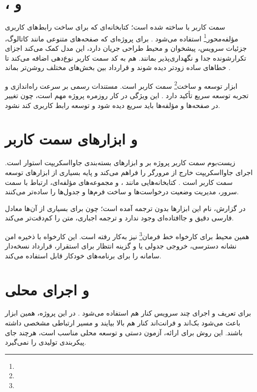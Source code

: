 \section{،  و }
سمت کاربر با  ساخته شده است؛ کتابخانه‌ای که برای ساخت رابط‌های کاربری مؤلفه‌محور\footnote{} استفاده می‌شود \cite{react}. برای پروژه‌ای که صفحه‌های متنوعی مانند کاتالوگ، جزئیات سرویس، پیشخوان و محیط طراحی جریان دارد، این مدل کمک می‌کند اجزای تکرارشونده جدا و نگهداری‌پذیر بمانند.  هم به کد سمت کاربر نوع‌دهی اضافه می‌کند تا خطاهای ساده زودتر دیده شوند و قرارداد بین بخش‌های مختلف روشن‌تر بماند \cite{typescript}.

 ابزار توسعه و ساخت\footnote{} سمت کاربر است. مستندات رسمی  بر سرعت راه‌اندازی و تجربه توسعه سریع تأکید دارد \cite{vite}. این ویژگی در کار روزمره پروژه مهم است، چون تغییر در صفحه‌ها و مؤلفه‌ها باید سریع دیده شود و توسعه رابط کاربری کند نشود.

\section{ و ابزارهای سمت کاربر}
زیست‌بوم سمت کاربر پروژه بر  و ابزارهای بسته‌بندی جاوااسکریپت استوار است.  اجرای جاوااسکریپت خارج از مرورگر را فراهم می‌کند و پایه بسیاری از ابزارهای توسعه سمت کاربر است \cite{nodejs}. کتابخانه‌هایی مانند ،  و مجموعه‌های مؤلفه‌ای، ارتباط با سمت سرور، مدیریت وضعیت درخواست‌ها و ساخت فرم‌ها و جدول‌ها را ساده‌تر می‌کنند.

در گزارش، نام این ابزارها بدون ترجمه آمده است؛ چون برای بسیاری از آن‌ها معادل فارسی دقیق و جاافتاده‌ای وجود ندارد و ترجمه اجباری، متن را کم‌دقت‌تر می‌کند.

همین محیط  برای کارخواه خط فرمان\footnote{} نیز به‌کار رفته است. این کارخواه با ذخیره امن نشانه دسترسی، خروجی جدولی یا  و گزینه انتظار برای استقرار، قرارداد نسخه‌دار سامانه را برای برنامه‌های خودکار قابل استفاده می‌کند.

\section{ و اجرای محلی}
 برای تعریف و اجرای چند سرویس کنار هم استفاده می‌شود \cite{docker}. در این پروژه، همین ابزار باعث می‌شود بک‌اند و فرانت‌اند کنار هم بالا بیایند و مسیر ارتباطی مشخصی داشته باشند. این روش برای ارائه، آزمون دستی و توسعه محلی مناسب است، هرچند جای پیکربندی تولیدی را نمی‌گیرد.

